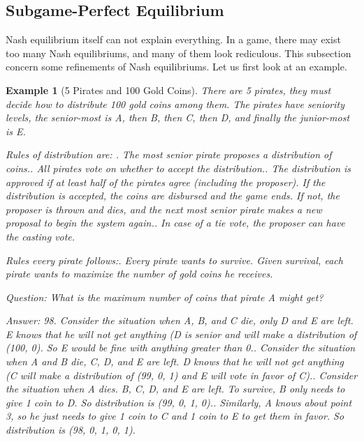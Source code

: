 \documentclass{article}
\newtheorem{Eg}{Example}[section]
\theoremstyle{definition}
\begin{document}
\subsection{Subgame-Perfect Equilibrium}
Nash equilibrium itself can not explain everything. In a game, there may exist too many Nash equilibriums, and many of them look rediculous. 
This subsection concern some refinements of Nash equilibriums.
Let us first look at an example.
\begin{Eg}[5 Pirates and 100 Gold Coins]
    There are 5 pirates, they must decide how to distribute 100 gold coins among them.
    The pirates have seniority levels, the senior-most is A, then B, then C, then D, and finally the junior-most is E. \par
    Rules of distribution are: . The most senior pirate proposes a distribution of coins.. All pirates vote on whether to accept the distribution.. The distribution is approved if at least half of the pirates agree (including the proposer). If the distribution is accepted, the coins are disbursed and the game ends.
    If not, the proposer is thrown and dies, and the next most senior pirate makes a new proposal to begin the system again.. In case of a tie vote, the proposer can have the casting vote. \par
    Rules every pirate follows:. Every pirate wants to survive. Given survival, each pirate wants to maximize the number of gold coins he receives.\par 
    Question: What is the maximum number of coins that pirate A might get? \par 
    Answer: 98. Consider the situation when A, B, and C die, only D and E are left. E knows that he will not get anything (D is senior and will make a distribution of (100, 0).
    So E would be fine with anything greater than 0.. Consider the situation when A and B die, C, D, and E are left. D knows that he will not get anything (C will make a distribution of (99, 0, 1) 
    and E will vote in favor of C).. Consider the situation when A dies. B, C, D, and E are left. To survive, B only needs to give 1 coin to D. So distribution is (99, 0, 1, 0).. Similarly, A knows about point 3, so he just needs to give 1 coin to C and 1 coin to E to get them in favor. So distribution is (98, 0, 1, 0, 1).
\end{Eg}
\end{document}
